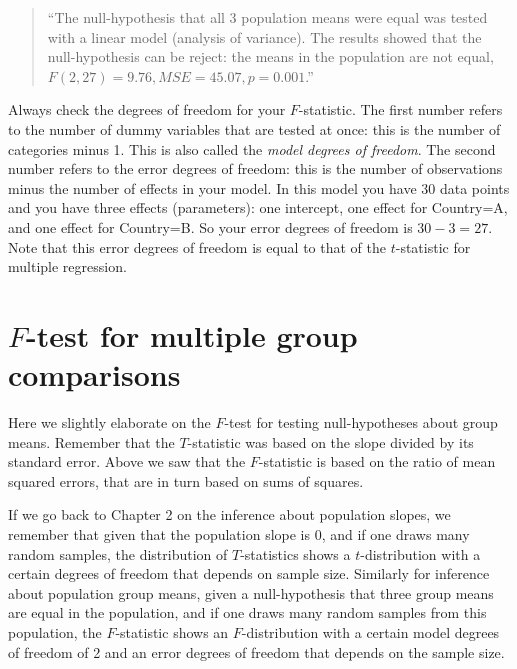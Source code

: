\documentclass[]{report}\usepackage[]{graphicx}\usepackage[]{color}
\begin{document}
\begin{quote}
``The null-hypothesis that all 3 population means were equal was tested with a linear model (analysis of variance). The results showed that the null-hypothesis can be reject: the means in the population are not equal, $F(2, 27)=9.76, MSE=45.07 , p = 0.001$.''
\end{quote}

Always check the degrees of freedom for your $F$-statistic. The first number refers to the number of dummy variables that are tested at once: this is the number of categories minus 1. This is also called the \textit{model degrees of freedom}. The second number refers to the error degrees of freedom: this is the number of observations minus the number of effects in your model. In this model you have 30 data points and you have three effects (parameters): one intercept, one effect for Country=A, and one effect for Country=B. So your error degrees of freedom is $30-3=27$. Note that this error degrees of freedom is equal to that of the $t$-statistic for multiple regression.



\section{$F$-test for multiple group comparisons}

Here we slightly elaborate on the $F$-test for testing null-hypotheses about group means. Remember that the $T$-statistic was based on the slope divided by its standard error. Above we saw that the $F$-statistic is based on the ratio of mean squared errors, that are in turn based on sums of squares. 

If we go back to Chapter 2 on the inference about population slopes, we remember that given that the population slope is 0, and if one draws many random samples, the distribution of $T$-statistics shows a $t$-distribution with a certain degrees of freedom that depends on sample size. Similarly for inference about population group means, given a null-hypothesis that three group means are equal in the population, and if one draws many random samples from this population, the $F$-statistic shows an $F$-distribution with a certain model degrees of freedom of 2 and an error degrees of freedom that depends on the sample size.
\end{document}

